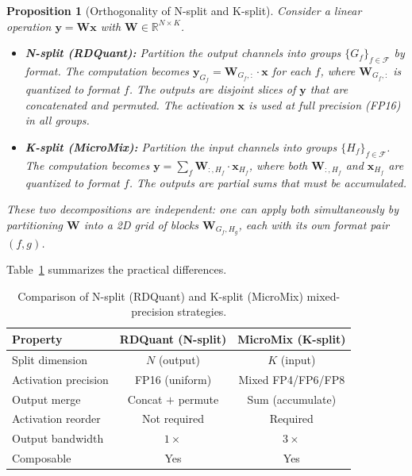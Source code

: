 \documentclass{article}
\newtheorem{proposition}{Proposition}
\begin{document}
\begin{proposition}[Orthogonality of N-split and K-split]
\label{prop:orthogonal}
Consider a linear operation $\mathbf{y} = \mathbf{W}\mathbf{x}$ with $\mathbf{W} \in \mathbb{R}^{N \times K}$.
\begin{itemize}
    \item \textbf{N-split (RDQuant):} Partition the output channels into groups $\{G_f\}_{f \in \mathcal{F}}$ by format.
    The computation becomes $\mathbf{y}_{G_f} = \mathbf{W}_{G_f,:} \cdot \mathbf{x}$ for each $f$, where $\mathbf{W}_{G_f,:}$ is quantized to format $f$.
    The outputs are disjoint slices of $\mathbf{y}$ that are concatenated and permuted.
    The activation $\mathbf{x}$ is used at full precision (FP16) in all groups.
    \item \textbf{K-split (MicroMix):} Partition the input channels into groups $\{H_f\}_{f \in \mathcal{F}}$.
    The computation becomes $\mathbf{y} = \sum_f \mathbf{W}_{:,H_f} \cdot \mathbf{x}_{H_f}$, where both $\mathbf{W}_{:,H_f}$ and $\mathbf{x}_{H_f}$ are quantized to format $f$.
    The outputs are partial sums that must be accumulated.
\end{itemize}
These two decompositions are independent: one can apply both simultaneously by partitioning $\mathbf{W}$ into a 2D grid of blocks $\mathbf{W}_{G_f, H_g}$, each with its own format pair $(f, g)$.
\end{proposition}

Table~\ref{tab:nsplit_vs_ksplit} summarizes the practical differences.

\begin{table}[t]
\centering
\caption{Comparison of N-split (RDQuant) and K-split (MicroMix) mixed-precision strategies.}
\label{tab:nsplit_vs_ksplit}
\begin{tabular}{lcc}
\toprule
\textbf{Property} & \textbf{RDQuant (N-split)} & \textbf{MicroMix (K-split)} \\
\midrule
Split dimension & $N$ (output) & $K$ (input) \\
Activation precision & FP16 (uniform) & Mixed FP4/FP6/FP8 \\
Output merge & Concat $+$ permute & Sum (accumulate) \\
Activation reorder & Not required & Required \\
Output bandwidth & $1\times$ & $3\times$ \\
Composable & Yes & Yes \\
\bottomrule
\end{tabular}
\end{table}
\end{document}
